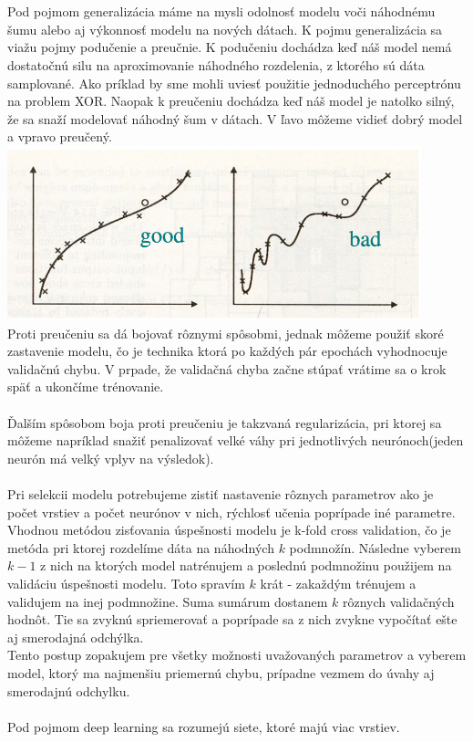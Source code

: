 \documentclass{article}
\numberwithin{equation}{section} %
\begin{document}
\\\\
Pod pojmom generalizácia máme na mysli odolnosť modelu voči náhodnému šumu alebo aj výkonnosť modelu na nových dátach. K pojmu generalizácia sa viažu pojmy podučenie a preučnie. K podučeniu dochádza keď náš model nemá dostatočnú silu na aproximovanie náhodného rozdelenia, z ktorého sú dáta samplované. Ako príklad by sme mohli uviesť použitie jednoduchého perceptrónu na problem XOR. Naopak k preučeniu dochádza keď náš model je natolko silný, že sa snaží modelovať náhodný šum v dátach. V ľavo môžeme vidieť dobrý model a vpravo preučený.\\
\includegraphics[width=12cm]{imgs/bias_var}\\
Proti preučeniu sa dá bojovať rôznymi spôsobmi, jednak môžeme použiť skoré zastavenie modelu, čo je technika ktorá po každých pár epochách vyhodnocuje validačnú chybu. V prpade, že validačná chyba začne stúpať vrátime sa o krok späť a ukončíme trénovanie.
\\\\
Ďalším spôsobom boja proti preučeniu je takzvaná regularizácia, pri ktorej sa môžeme napríklad snažiť penalizovať velké váhy pri jednotlivých neurónoch(jeden neurón má velký vplyv na výsledok).
\\\\
Pri selekcii modelu potrebujeme zistiť nastavenie rôznych parametrov ako je počet vrstiev a počet neurónov v nich, rýchlosť učenia poprípade iné parametre. Vhodnou metódou zisťovania úspešnosti modelu je k-fold cross validation, čo je metóda pri ktorej rozdelíme dáta na náhodných $k$ podmnožín. Následne vyberem $k-1$ z nich na ktorých model natrénujem a poslednú podmnožinu použijem na validáciu úspešnosti modelu. Toto spravím $k$ krát - zakaždým trénujem a validujem na inej podmnožine. Suma sumárum dostanem $k$ rôznych validačných hodnôt. Tie sa zvyknú spriemerovať a poprípade sa z nich zvykne vypočítať ešte aj smerodajná odchýlka. 
\\
Tento postup zopakujem pre všetky možnosti uvažovaných parametrov a vyberem model, ktorý ma najmenšiu priemernú chybu, prípadne vezmem do úvahy aj smerodajnú odchylku.
\\\\
Pod pojmom deep learning sa rozumejú siete, ktoré majú viac vrstiev.
\end{document}
